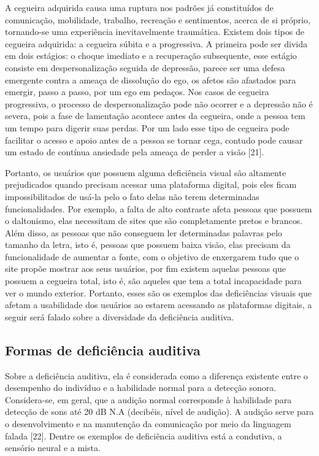 \documentclass[a4paper]{article}
\begin{document}
\begin{titlepage}
A cegueira adquirida causa uma ruptura nos padrões já constituídos de comunicação, mobilidade, trabalho, recreação e sentimentos, acerca de si próprio, tornando-se uma experiência inevitavelmente traumática. Existem dois tipos de cegueira adquirida: a cegueira súbita e a progressiva. A primeira pode ser divida em dois estágios: o choque imediato e a recuperação subsequente, esse estágio consiste em despersonalização seguida de depressão, parece ser uma defesa emergente contra a ameaça de dissolução do ego, os afetos são afastados para emergir, passo a passo, por um ego em pedaços. Nos casos de cegueira progressiva, o processo de despersonalização pode não ocorrer e a depressão não é severa, pois a fase de lamentação acontece antes da cegueira, onde a pessoa tem um tempo para digerir suas perdas. Por um lado esse tipo de cegueira pode facilitar o acesso e apoio antes de a pessoa se tornar cega, contudo pode causar um estado de contínua ansiedade pela ameaça de perder a visão [21].

Portanto, os usuários que possuem alguma deficiência visual são altamente prejudicados quando precisam acessar uma plataforma digital, pois eles ficam impossibilitados de usá-la pelo o fato delas não terem determinadas funcionalidades. Por exemplo, a falta de alto contraste afeta pessoas que possuem o daltonismo, elas necessitam de sites que são completamente pretos e brancos. Além disso, as pessoas que não conseguem ler determinadas palavras pelo tamanho da letra, isto é, pessoas que possuem baixa visão, elas precisam da funcionalidade de aumentar a fonte, com o objetivo de enxergarem tudo que o site propõe mostrar aos seus usuários, por fim existem aquelas pessoas que possuem a cegueira total, isto é, são aqueles que tem a total incapacidade para ver o mundo exterior. Portanto, esses são os exemplos das deficiências visuais que afetam a usabilidade dos usuários ao estarem acessando as plataformas digitais, a seguir será falado sobre a diversidade da deficiência auditiva.

\subsection{Formas de deficiência auditiva}
Sobre a deficiência auditiva, ela é considerada como a diferença existente entre o desempenho do indivíduo e a habilidade normal para a detecção sonora. Considera-se, em geral, que a audição normal corresponde à habilidade para detecção de sons até 20 dB N.A (decibéis, nível de audição). A audição serve para o desenvolvimento e na manutenção da comunicação por meio da linguagem falada [22]. Dentre os exemplos de deficiência auditiva está a condutiva, a sensório neural e a mista.


\end{titlepage}
\end{document}

